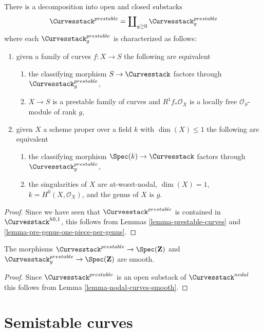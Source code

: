\begin{lemma}
\label{lemma-prestable-one-piece-per-genus}
There is a decomposition into open and closed substacks
$$
\Curvesstack^{prestable} = \coprod\nolimits_{g \geq 0}
\Curvesstack^{prestable}_g
$$
where each $\Curvesstack^{prestable}_g$ is characterized as follows:
\begin{enumerate}
\item given a family of curves $f : X \to S$ the following are equivalent
\begin{enumerate}
\item the classifying morphism $S \to \Curvesstack$ factors
through $\Curvesstack^{prestable}_g$,
\item $X \to S$ is a prestable family of curves and
$R^1f_*\mathcal{O}_X$ is a locally free $\mathcal{O}_S$-module of rank $g$,
\end{enumerate}
\item given $X$ a scheme proper over a field $k$ with
$\dim(X) \leq 1$ the following are equivalent
\begin{enumerate}
\item the classifying morphism $\Spec(k) \to \Curvesstack$
factors through $\Curvesstack^{prestable}_g$,
\item the singularities of $X$ are at-worst-nodal, $\dim(X) = 1$,
$k = H^0(X, \mathcal{O}_X)$, and the genus of $X$ is $g$.
\end{enumerate}
\end{enumerate}
\end{lemma}

\begin{proof}
Since we have seen that $\Curvesstack^{prestable}$ is contained
in $\Curvesstack^{h0, 1}$, this
follows from Lemmas \ref{lemma-prestable-curves} and
\ref{lemma-pre-genus-one-piece-per-genus}.
\end{proof}

\begin{lemma}
\label{lemma-prestable-curves-smooth}
The morphisms
$\Curvesstack^{prestable} \to \Spec(\mathbf{Z})$ and
$\Curvesstack^{prestable}_g \to \Spec(\mathbf{Z})$ are
smooth.
\end{lemma}

\begin{proof}
Since $\Curvesstack^{prestable}$ is an open substack of
$\Curvesstack^{nodal}$ this follows from
Lemma \ref{lemma-nodal-curves-smooth}.
\end{proof}




\section{Semistable curves}
\label{section-semistable-curves}

